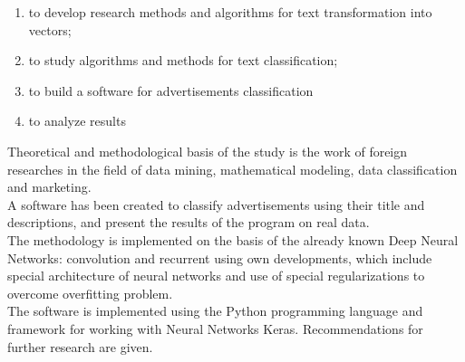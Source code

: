 \begin{enumerate}
	\item to develop research methods and algorithms for text transformation into vectors;
	\item to study algorithms and methods for text classification;
	\item to build a software for advertisements classification
	\item to analyze results 
\end{enumerate}

Theoretical and methodological basis of the study is the work of foreign researches in the field of data mining, mathematical modeling, data classification and marketing. \\
A software has been created to classify advertisements using their title and descriptions, and present the results of the program on real data.\\
The methodology is implemented on the basis of the already known Deep Neural Networks: convolution and recurrent using own developments, which include special architecture of neural networks and use of special regularizations to overcome overfitting problem. \\
The software is implemented using the Python programming language and
framework for working with Neural Networks Keras. Recommendations for further research are given. \\
\clearpage
